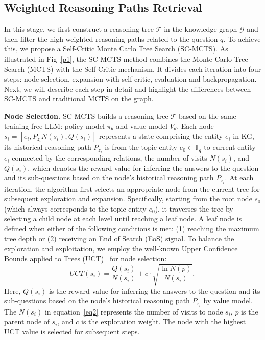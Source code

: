 \documentclass[lettersize,journal]{IEEEtran}
\begin{document}
\subsection{Weighted Reasoning Paths Retrieval}
In this stage, we first construct a reasoning tree $\mathcal{T}$ in the knowledge graph $\mathcal{G}$ and then filter the high-weighted reasoning paths related to the question $q$. To achieve this, we propose a Self-Critic Monte Carlo Tree Search (SC-MCTS). As illustrated in Fig~\ref{p1}, the SC-MCTS method combines the Monte Carlo Tree Search (MCTS) with the Self-Critic mechanism. It divides each iteration into four steps: node selection, expansion with self-critic, evaluation and backpropagation. Next, we will describe each step in detail and highlight the differences between SC-MCTS and traditional MCTS on the graph.

\textbf{Node Selection.} 
SC-MCTS builds a reasoning tree $\mathcal{T}$ based on the same training-free LLM: policy model $\pi_{\theta}$ and value model $V_\theta$. Each node $s_i=[e_i, P_{z_i} N(s_i), Q(s_i)]$ represents a state comprising the entity $e_i$ in KG, its historical reasoning path $P_{z_i}$ is from the topic entity $e_0 \in \mathbb{T}_q$ to current entity $e_i$ connected by the corresponding relations, the number of visits $N(s_i)$, and $Q(s_i)$, which denotes the reward value for inferring the answers to the question and its sub-questions based on the node's historical reasoning path $P_{z_i}$.
At each iteration, the algorithm first selects an appropriate node from the current tree for subsequent exploration and expansion. Specifically, starting from the root node $s_0$ (which always corresponds to the topic entity $e_0$), it traverses the tree by selecting a child node at each level until reaching a leaf node. A leaf node is defined when either of the following conditions is met: (1) reaching the maximum tree depth or (2) receiving an End of Search (EoS) signal. To balance the exploration and exploitation, we employ the well-known Upper Confidence Bounds applied to Trees (UCT)~\cite{kocsis2006bandit} for node selection:
\begin{equation}
    UCT(s_i) = \frac{Q(s_i)}{N(s_i)} + c \cdot \sqrt{\frac{\ln N(p)}{N(s_i)}},
    \label{eq2}
\end{equation}
Here, $Q(s_i)$ is the reward value for inferring the answers to the question and its sub-questions based on the node's historical reasoning path $P_{z_i}$ by value model. The $N(s_i)$ in equation~\ref{eq2} represents the number of visits to node $s_i$, $p$ is the parent node of $s_i$, and $c$ is the exploration weight. The node with the highest UCT value is selected for subsequent steps.
\end{document}
